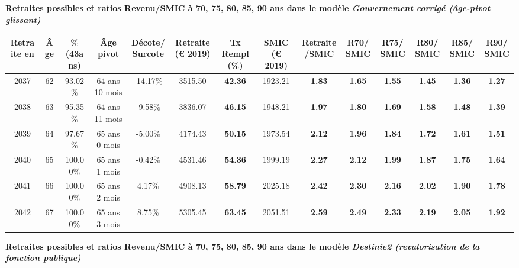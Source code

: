  \vspace{0.1cm} 
{\bf \noindent Retraites possibles et ratios Revenu/SMIC à 70, 75, 80, 85, 90 ans dans le modèle \emph{Gouvernement corrigé (âge-pivot glissant)}}  
 
\begin{adjustbox}{max width=\textwidth} 
\begin{tabular}[htb]{|c|c||c|c|c||c|c||c|c||c|c|c|c|c|} 
\hline 
 Retraite en &  Âge &  \%(43ans) &  Âge pivot &  Décote/Surcote &  Retraite (\euro{} 2019) &  Tx Rempl(\%) &  SMIC (\euro{} 2019) &  Retraite/SMIC &  R70/SMIC &  R75/SMIC &  R80/SMIC &  R85/SMIC &  R90/SMIC \\ 
\hline \hline 
 2037 &  62 &  93.02\% &  64 ans 10 mois &  -14.17\% &  3515.50 &  {\bf 42.36} &  1923.21 &  {\bf 1.83} &  {\bf 1.65} &  {\bf 1.55} &  {\bf 1.45} &  {\bf 1.36} &  {\bf 1.27} \\ 
\hline 
 2038 &  63 &  95.35\% &  64 ans 11 mois &  -9.58\% &  3836.07 &  {\bf 46.15} &  1948.21 &  {\bf 1.97} &  {\bf 1.80} &  {\bf 1.69} &  {\bf 1.58} &  {\bf 1.48} &  {\bf 1.39} \\ 
\hline 
 2039 &  64 &  97.67\% &  65 ans 0 mois &  -5.00\% &  4174.43 &  {\bf 50.15} &  1973.54 &  {\bf 2.12} &  {\bf 1.96} &  {\bf 1.84} &  {\bf 1.72} &  {\bf 1.61} &  {\bf 1.51} \\ 
\hline 
 2040 &  65 &  100.00\% &  65 ans 1 mois &  -0.42\% &  4531.46 &  {\bf 54.36} &  1999.19 &  {\bf 2.27} &  {\bf 2.12} &  {\bf 1.99} &  {\bf 1.87} &  {\bf 1.75} &  {\bf 1.64} \\ 
\hline 
 2041 &  66 &  100.00\% &  65 ans 2 mois &  4.17\% &  4908.13 &  {\bf 58.79} &  2025.18 &  {\bf 2.42} &  {\bf 2.30} &  {\bf 2.16} &  {\bf 2.02} &  {\bf 1.90} &  {\bf 1.78} \\ 
\hline 
 2042 &  67 &  100.00\% &  65 ans 3 mois &  8.75\% &  5305.45 &  {\bf 63.45} &  2051.51 &  {\bf 2.59} &  {\bf 2.49} &  {\bf 2.33} &  {\bf 2.19} &  {\bf 2.05} &  {\bf 1.92} \\ 
\hline 
\hline 
\end{tabular} 
\end{adjustbox} 
 
 \vspace{0.1cm} 
{\bf \noindent Retraites possibles et ratios Revenu/SMIC à 70, 75, 80, 85, 90 ans dans le modèle \emph{Destinie2 (revalorisation de la fonction publique)}}  
 
